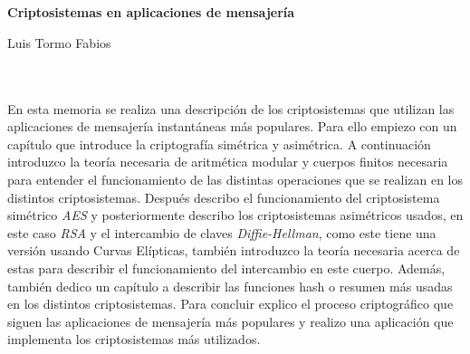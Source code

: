 \chapter*{}


%




\begin{center}
{\large\bfseries Criptosistemas en aplicaciones de mensajería}\\
\end{center}
\begin{center}
Luis Tormo Fabios\\
\end{center}

\\

\vspace{0.7cm}
\\

En esta memoria se realiza una descripción de los criptosistemas que utilizan las aplicaciones de mensajería instantáneas más populares. Para ello empiezo con un capítulo que introduce la criptografía simétrica y asimétrica. A continuación introduzco la teoría necesaria de aritmética modular y cuerpos finitos necesaria para entender el funcionamiento de las distintas operaciones que se realizan en los distintos criptosistemas. Después describo el funcionamiento del criptosistema simétrico \emph{AES} y posteriormente describo los criptosistemas asimétricos usados, en este caso \emph{RSA} y el intercambio de claves \emph{Diffie-Hellman}, como este tiene una versión usando Curvas Elípticas, también introduzco la teoría necesaria acerca de estas para describir el funcionamiento del intercambio en este cuerpo. Además, también dedico un capítulo a describir las funciones hash o resumen más usadas en los distintos criptosistemas. Para concluir explico el proceso criptográfico que siguen las aplicaciones de mensajería más populares y realizo una aplicación que implementa los criptosistemas más utilizados.

\cleardoublepage


